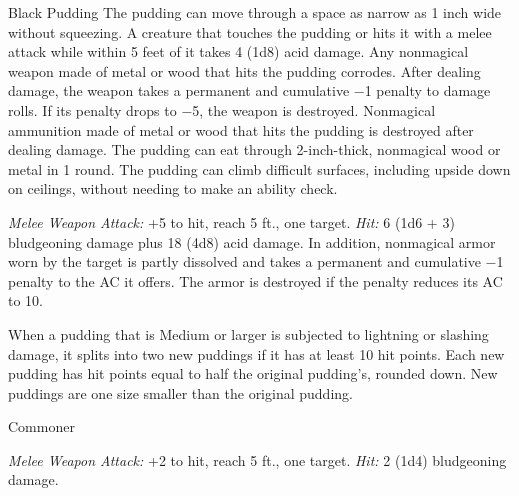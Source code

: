 \documentclass[10pt,a4paper,twoside,twocolumn,openany,bg=print,nodeprecatedcode]{dndbook}
\begin{document}
\clearpage

\begin{DndMonster}[float*=t]{Black Pudding}
\DndMonsterBasics[
armor-class = {7},
hit-points = {\DndDice{10d10 + 30}},
speed = {20 ft., 20 ft. (key)}
]
\DndMonsterAbilityScores[
 str = 16,
 dex = 5,
 con = 16,
 int = 1,
 wis = 6,
 cha = 1
]
\DndMonsterDetails[
damage-immunities = {acid, cold, lightning, slashing},
senses = {blindsight 60 ft. (blind beyond this radius), passive perception 8},
challenge = 4,
]
The pudding can move through a space as narrow as 1 inch wide without squeezing.
A creature that touches the pudding or hits it with a melee attack while within 5 feet of it takes 4 (1d8) acid damage. Any nonmagical weapon made of metal or wood that hits the pudding corrodes. After dealing damage, the weapon takes a permanent and cumulative −1 penalty to damage rolls. If its penalty drops to −5, the weapon is destroyed. Nonmagical ammunition made of metal or wood that hits the pudding is destroyed after dealing damage. The pudding can eat through 2-inch-thick, nonmagical wood or metal in 1 round.
The pudding can climb difficult surfaces, including upside down on ceilings, without needing to make an ability check.
\par
{}
\textsl{Melee Weapon Attack:} +5 to hit, reach 5 ft., one target. \textsl{Hit:} 6 (1d6 + 3) bludgeoning damage plus 18 (4d8) acid damage. In addition, nonmagical armor worn by the target is partly dissolved and takes a permanent and cumulative −1 penalty to the AC it offers. The armor is destroyed if the penalty reduces its AC to 10.
\par
{}
When a pudding that is Medium or larger is subjected to lightning or slashing damage, it splits into two new puddings if it has at least 10 hit points. Each new pudding has hit points equal to half the original pudding's, rounded down. New puddings are one size smaller than the original pudding.
\end{DndMonster}



\begin{DndMonster}[float*=t]{Commoner}
\DndMonsterBasics[
armor-class = {10},
hit-points = {\DndDice{1d8}},
speed = {30 ft.}
]
\DndMonsterAbilityScores[
 str = 10,
 dex = 10,
 con = 10,
 int = 10,
 wis = 10,
 cha = 10
]
\DndMonsterDetails[
languages = {any one language (usually Common)},
challenge = 0,
]
\par
{}
\textsl{Melee Weapon Attack:} +2 to hit, reach 5 ft., one target. \textsl{Hit:} 2 (1d4) bludgeoning damage.
\end{DndMonster}
\end{document}
